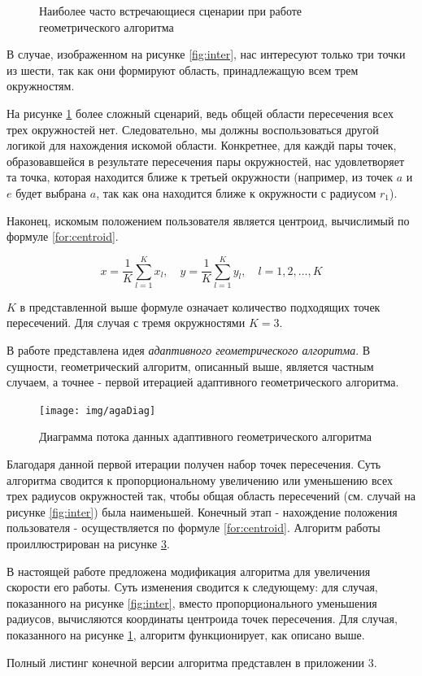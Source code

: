 \begin{figure}
\begin{subfigure}[ht]{0.4\textwidth}
        \caption{}
        \label{fig:outer}
    \end{subfigure}
    \caption{Наиболее часто встречающиеся сценарии при работе геометрического алгоритма}
    \label{fig:scenarios}
\end{figure}

В случае, изображенном на рисунке \ref{fig:inter}, нас интересуют только три точки из шести, так как они формируют область, принадлежащую всем трем окружностям.

На рисунке \ref{fig:outer} более сложный сценарий, ведь общей области пересечения всех трех окружностей нет. Следовательно, мы должны воспользоваться другой логикой для нахождения искомой области. Конкретнее, для каждй пары точек, образовавшейся в результате пересечения пары окружностей, нас удовлетворяет та точка, которая находится ближе к третьей окружности (например, из точек $a$ и $e$ будет выбрана $a$, так как она находится ближе к окружности с радиусом $r_1$).

Наконец, искомым положением пользователя является центроид, вычислимый по формуле \ref{for:centroid}.
 
\begin{equation} \label{for:centroid}
    x = \frac{1}{K}\sum^K_{l=1}x_l, \quad y = \frac{1}{K}\sum^K_{l=1}y_l, \quad  l = 1,2,...,K
\end{equation}

$K$ в представленной выше формуле означает количество подходящих точек пересечений. Для случая с тремя окружностями $K=3$.

В работе \cite{brida2013novel} представлена идея \textit{адаптивного геометрического алгоритма}. В сущности, геометрический алгоритм, описанный выше, является частным случаем, а точнее - первой итерацией адаптивного геометрического алгоритма. 

\begin{figure}[ht]
    \centering
    \texttt{[image: img/agaDiag]}
    \caption{Диаграмма потока данных адаптивного геометрического алгоритма}
    \label{fig:aga}
\end{figure}

Благодаря данной первой итерации получен набор точек пересечения. Суть алгоритма сводится к пропорциональному увеличению или уменьшению всех трех радиусов окружностей так, чтобы общая область пересечений (см. случай на рисунке \ref{fig:inter}) была наименьшей. Конечный этап - нахождение положения пользователя - осуществляется по формуле \ref{for:centroid}. Алгоритм работы проиллюстрирован на рисунке \ref{fig:aga}.

В настоящей работе предложена модификация алгоритма для увеличения скорости его работы. Суть изменения сводится к следующему: для случая, показанного на рисунке \ref{fig:inter}, вместо пропорционального уменьшения радиусов, вычисляются координаты центроида точек пересечения. Для случая, показанного на рисунке \ref{fig:outer}, алгоритм функционирует, как описано выше. 

Полный листинг конечной версии алгоритма представлен в приложении 3.